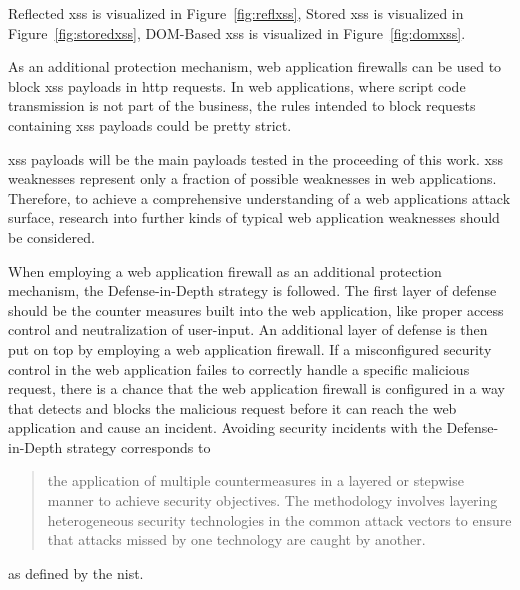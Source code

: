 Reflected \acrshort{xss} is visualized in Figure~\ref{fig:reflxss}, Stored \acrshort{xss} is visualized in Figure~\ref{fig:storedxss}, DOM-Based \acrshort{xss} is visualized in Figure~\ref{fig:domxss}.

As an additional protection mechanism, web application firewalls can be used to block \acrshort{xss} payloads in \acrshort{http} requests. In web applications, where script code transmission is not part of the business, the rules intended to block requests containing \acrshort{xss} payloads could be pretty strict.

\acrshort{xss} payloads will be the main payloads tested in the proceeding of this work.
\acrshort{xss} weaknesses represent only a fraction of possible weaknesses in web applications. Therefore, to achieve a comprehensive understanding of a web applications attack surface, research into further kinds of typical web application weaknesses should be considered.

When employing a web application firewall as an additional protection mechanism, the Defense-in-Depth strategy is followed.
The first layer of defense should be the counter measures built into the web application, like proper access control and neutralization of user-input.
An additional layer of defense is then put on top by employing a web application firewall.
If a misconfigured security control in the web application failes to correctly handle a specific malicious request, there is a chance that the web application firewall is configured in a way that detects and blocks the malicious request before it can reach the web application and cause an incident.
Avoiding security incidents with the Defense-in-Depth strategy corresponds to
\begin{quote}
	the application of multiple countermeasures in a layered or stepwise manner to achieve security objectives. The methodology involves layering heterogeneous security technologies in the common attack vectors to ensure that attacks missed by one technology are caught by another.
\end{quote}
as defined by the \acrfull{nist}. \cite{nist/did}




